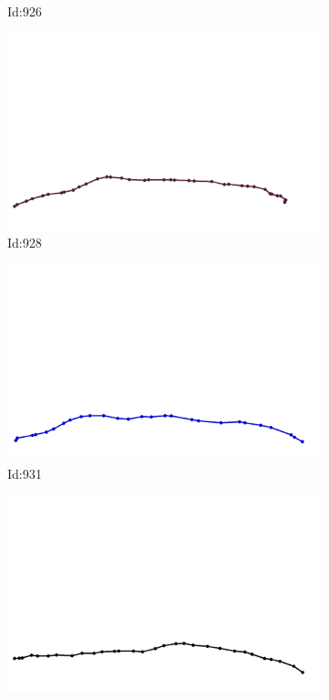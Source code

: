 \documentclass[12pt,twoside]{report}
\begin{document}
\begin{figure}
\begin{subfigure}[b]{0.20\textwidth}
\caption{Id:926}
\end{subfigure}
\begin{subfigure}[b]{0.20\textwidth}
\centering
\includegraphics[width=\textwidth]{../trajectories/928.png}
\caption{Id:928}
\end{subfigure}
\begin{subfigure}[b]{0.20\textwidth}
\centering
\includegraphics[width=\textwidth]{../trajectories/931.png}
\caption{Id:931}
\end{subfigure}
\begin{subfigure}[b]{0.20\textwidth}
\centering
\includegraphics[width=\textwidth]{../trajectories/948.png}

\end{subfigure}
\end{figure}
\end{document}
